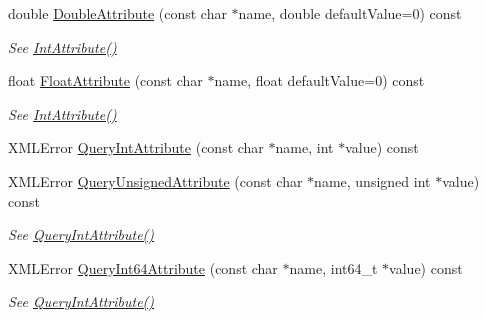 \begin{DoxyCompactItemize}
double \hyperlink{classCPlantBox_1_1tinyxml2_1_1XMLElement_abb3cb33b53c1fb5d21a4afa1d2dc2727}{Double\+Attribute} (const char $\ast$name, double default\+Value=0) const
\begin{DoxyCompactList}\small\item\em See \hyperlink{classCPlantBox_1_1tinyxml2_1_1XMLElement_ac0bb2fd733415649e95c36b08a7b700e}{Int\+Attribute()} \end{DoxyCompactList}\item 
\mbox{\label{classCPlantBox_1_1tinyxml2_1_1XMLElement_a41d620fd451534fd077f69343b85ffed}} 
float \hyperlink{classCPlantBox_1_1tinyxml2_1_1XMLElement_a41d620fd451534fd077f69343b85ffed}{Float\+Attribute} (const char $\ast$name, float default\+Value=0) const
\begin{DoxyCompactList}\small\item\em See \hyperlink{classCPlantBox_1_1tinyxml2_1_1XMLElement_ac0bb2fd733415649e95c36b08a7b700e}{Int\+Attribute()} \end{DoxyCompactList}\item 
X\+M\+L\+Error \hyperlink{classCPlantBox_1_1tinyxml2_1_1XMLElement_adb0a6e52cb23f9226fa31af9eaebfd72}{Query\+Int\+Attribute} (const char $\ast$name, int $\ast$value) const
\item 
\mbox{\label{classCPlantBox_1_1tinyxml2_1_1XMLElement_a80f814591ee464de5fff4e230652ac50}} 
X\+M\+L\+Error \hyperlink{classCPlantBox_1_1tinyxml2_1_1XMLElement_a80f814591ee464de5fff4e230652ac50}{Query\+Unsigned\+Attribute} (const char $\ast$name, unsigned int $\ast$value) const
\begin{DoxyCompactList}\small\item\em See \hyperlink{classCPlantBox_1_1tinyxml2_1_1XMLElement_adb0a6e52cb23f9226fa31af9eaebfd72}{Query\+Int\+Attribute()} \end{DoxyCompactList}\item 
\mbox{\label{classCPlantBox_1_1tinyxml2_1_1XMLElement_a62df8dada177120ca95e46834ffcaf3c}} 
X\+M\+L\+Error \hyperlink{classCPlantBox_1_1tinyxml2_1_1XMLElement_a62df8dada177120ca95e46834ffcaf3c}{Query\+Int64\+Attribute} (const char $\ast$name, int64\+\_\+t $\ast$value) const
\begin{DoxyCompactList}\small\item\em See \hyperlink{classCPlantBox_1_1tinyxml2_1_1XMLElement_adb0a6e52cb23f9226fa31af9eaebfd72}{Query\+Int\+Attribute()} \end{DoxyCompactList}\item 

\end{DoxyCompactItemize}
